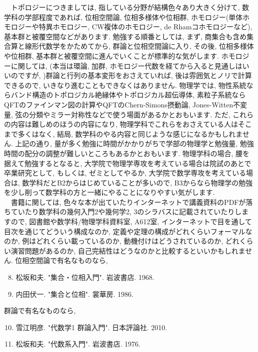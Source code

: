 \documentclass[10pt,a4paper]{jsarticle}
\begin{document}
\begin{itemize}
    　トポロジーにつきましては, 指している分野が結構色々あり大きく分けて, 数学科の学部程度であれば, 位相空間論, 位相多様体や位相群, ホモロジー(単体ホモロジーや特異ホモロジー, CW複体のホモロジー, de Rhamコホモロジーなど), 基本群と被覆空間などがあります. 勉強する順番としては, まず, 商集合も含め集合算と線形代数学をかためてから, 群論と位相空間論に入り, その後, 位相多様体や位相群, 基本群と被覆空間に進んでいくことが標準的な気がします. ホモロジーに関しては, (本当は環論, 加群, ホモロジー代数を経てから入ると見通しはいいのですが, )群論と行列の基本変形をおさえていれば, 後は雰囲気とノリで計算できるので, いきなり進むこともできなくはありません. 物理学では, 物性系統ならバンド構造のトポロジカル絶縁体やトポロジカル超伝導体, 素粒子系統ならQFTのファインマン図の計算やQFTのChern-Simons摂動論, Jones-Witten不変量, 弦の分類やミラー対称性などで使う場面があるかとおもいます. ただ, これらの内容は難しめのほうの内容になり, 物理学科でこれらをおさえている人はそこまで多くはなく, 結局, 数学科のやる内容と同じような感じになるかもしれません. 上記の通り, 量が多く勉強に時間がかかりがちで学部の物理学と勉強量, 勉強時間の配分の調整が難しいところもあるかとおもいます. 物理学科の場合, 腰を据えて勉強するとなると, 大学院で物理学専攻を考えている場合は院試のあとで卒業研究として, もしくは, ゼミとしてやるか, 大学院で数学専攻を考えている場合は, 数学科だとB2からはじめていることが多いので, B3からなら物理学の勉強を少し削って数学科の方と一緒にやることになりやすい気がします. \\
    　書籍に関しては, 色々な本が出ていたりインターネットで講義資料のPDFが落ちていたり数学科の幾何入門2や幾何学2, 3のシラバスに記載されていたりしますので, 図書館や数学科/物理学科資料室, A612室, インターネットで目を通して目次を通じてどういう構成なのか, 定義や定理の構成がどれくらいフォーマルなのか, 例はどれくらい載っているのか, 動機付けはどうされているのか, どれくらい演習問題があるのか, 自己完結性はどうなのかと比較するといいかもしれません. 位相空間論で有名なものなら, 
    \begin{enumerate}
    \setcounter{enumi}{7}
        \item 松坂和夫. "集合・位相入門". 岩波書店. 1968. 
        \item 内田伏一. "集合と位相". 裳華房. 1986. 
    \end{enumerate}
    群論で有名なものなら, 
    \begin{enumerate}
    \setcounter{enumi}{9}
        \item 雪江明彦. "代数学1 群論入門". 日本評論社. 2010. 
        \item 松坂和夫. "代数系入門". 岩波書店. 1976. 

\end{enumerate}
\end{itemize}
\end{document}
